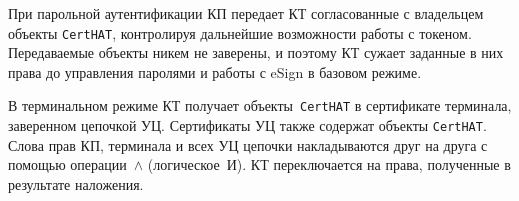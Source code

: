 При парольной аутентификации КП передает КТ согласованные с владельцем
объекты \texttt{CertHAT}, контролируя дальнейшие возможности работы с токеном. 
Передаваемые объекты никем не заверены, и поэтому КТ сужает заданные в них права 
до управления паролями и работы с eSign в базовом режиме. 

В терминальном режиме КТ получает объекты~\texttt{CertHAT} в сертификате терминала, 
заверенном цепочкой УЦ. Сертификаты УЦ также содержат объекты \texttt{CertHAT}.
Слова прав КП, терминала и всех УЦ цепочки накладываются друг на друга с 
помощью операции~$\wedge$ (логическое~И). КТ переключается на права, полученные 
в результате наложения.



